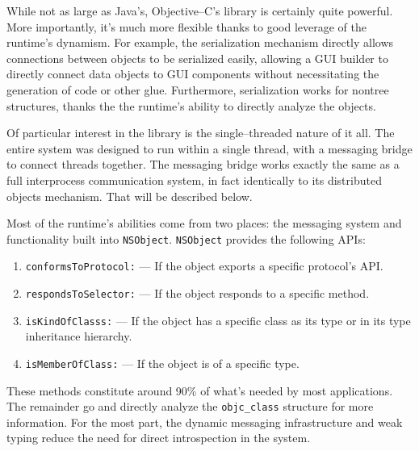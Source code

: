 	While not as large as Java's, Objective--C's library is certainly quite powerful.   More importantly, it's much more flexible thanks to good leverage of the runtime's dynamism.  For example, the serialization mechanism directly allows connections between objects to be serialized easily, allowing a GUI builder to directly connect data objects to GUI components without necessitating the generation of code or other glue.  Furthermore, serialization works for nontree structures, thanks the the runtime's ability to directly analyze the objects.

	Of particular interest in the library is the single--threaded nature of it all.  The entire system was designed to run within a single thread, with a messaging bridge to connect threads together.  The messaging bridge works exactly the same as a full interprocess communication system, in fact identically to its distributed objects mechanism.  That will be described below.

	Most of the runtime's abilities come from two places: the messaging system and functionality built into \texttt{NSObject}.  \texttt{NSObject} provides the following APIs:

\begin{enumerate}
	\item \texttt{conformsToProtocol:} --- If the object exports a specific protocol's API.
	\item \texttt{respondsToSelector:} --- If the object responds to a specific method.
	\item \texttt{isKindOfClasss:} --- If the object has a specific class as its type or in its type inheritance hierarchy.
	\item \texttt{isMemberOfClass:} --- If the object is of a specific type.
\end{enumerate}

	These methods constitute around 90\% of what's needed by most applications.  The remainder go and directly analyze the \texttt{objc\_class} structure for more information.  For the most part, the dynamic messaging infrastructure and weak typing reduce the need for direct introspection in the system.




